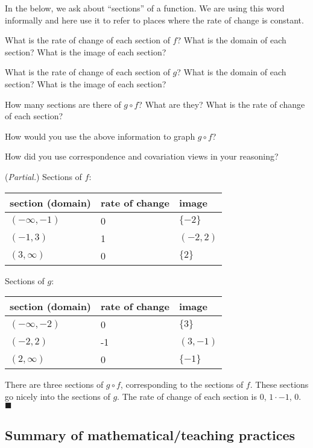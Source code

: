 \documentclass[11pt]{article}
\newenvironment{task}
	{\begin{mdframed}[linecolor=lightgray, linewidth=3pt]\raggedright}
	{\end{mdframed}}
\theoremstyle{definition}
\newenvironment{solution}{{\it Solution.} }{\hfill {\color{lightgray}$\blacksquare$}}
\begin{document}
In the below, we ask about ``sections'' of a function. We are using this word informally and here use it to refer to  places where the rate of change is constant.

\begin{task}
What is the rate of change of each section of $f$? What is the domain of each section?
 What is the image of each section?

What is the rate of change of each section of $g$? What is the domain of each section?  What is the image of each section?

How many sections are there of $g\circ f$? What are they? What is the rate of change of each section?

How would you use the above information to graph $g\circ f$?

How did you use correspondence and covariation views in your reasoning?
\end{task}

\begin{solution} ({\it Partial.})
Sections of $f$:  \\
\begin{tabular}{L{1.75in}L{1.75in}L{1.75in}}
section (domain) & rate of change & image \\ \hline
$(-\infty, -1)$ & 0 & $\{-2\}$ \\
$(-1,3)$ & 1 & $(-2,2)$ \\
$(3,\infty)$ & 0 & $\{2\}$
\end{tabular}

Sections of $g$:  \\
\begin{tabular}{L{1.75in}L{1.75in}L{1.75in}}
section (domain) & rate of change & image \\ \hline
$(-\infty, -2)$ & 0 & $\{3\}$ \\
$(-2,2)$ & -1 & $(3,-1)$ \\
$(2,\infty)$ & 0 & $\{-1\}$
\end{tabular}

There are three sections of $g\circ f$, corresponding to the sections of $f$. These sections go nicely into the sections of $g$. The rate of change of each section is $0$, $1\cdot-1$, $0$. 
\end{solution}

\newpage

\subsection{Summary of mathematical/teaching practices}
\end{document}
